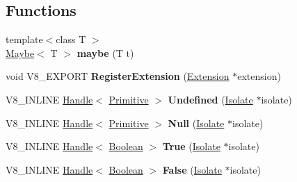 \subsection*{Functions}
\begin{DoxyCompactItemize}
\item 
\hypertarget{namespacev8_a92c0733af0c413cee85e20b983bb2a5b}{}{\footnotesize template$<$class T $>$ }\\\hyperlink{structv8_1_1_maybe}{Maybe}$<$ T $>$ {\bfseries maybe} (T t)\label{namespacev8_a92c0733af0c413cee85e20b983bb2a5b}

\item 
\hypertarget{namespacev8_a50b91e1100a42cc12e7295b22d44d9d0}{}void V8\+\_\+\+E\+X\+P\+O\+R\+T {\bfseries Register\+Extension} (\hyperlink{classv8_1_1_extension}{Extension} $\ast$extension)\label{namespacev8_a50b91e1100a42cc12e7295b22d44d9d0}

\item 
\hypertarget{namespacev8_af7d2f7fc42d6873af561b885151168d7}{}V8\+\_\+\+I\+N\+L\+I\+N\+E \hyperlink{classv8_1_1_handle}{Handle}$<$ \hyperlink{classv8_1_1_primitive}{Primitive} $>$ {\bfseries Undefined} (\hyperlink{classv8_1_1_isolate}{Isolate} $\ast$isolate)\label{namespacev8_af7d2f7fc42d6873af561b885151168d7}

\item 
\hypertarget{namespacev8_ad3e6b3f6b548745a461b71f3bfb17ef1}{}V8\+\_\+\+I\+N\+L\+I\+N\+E \hyperlink{classv8_1_1_handle}{Handle}$<$ \hyperlink{classv8_1_1_primitive}{Primitive} $>$ {\bfseries Null} (\hyperlink{classv8_1_1_isolate}{Isolate} $\ast$isolate)\label{namespacev8_ad3e6b3f6b548745a461b71f3bfb17ef1}

\item 
\hypertarget{namespacev8_acbc2c4a2a277e913ae100014559f6030}{}V8\+\_\+\+I\+N\+L\+I\+N\+E \hyperlink{classv8_1_1_handle}{Handle}$<$ \hyperlink{classv8_1_1_boolean}{Boolean} $>$ {\bfseries True} (\hyperlink{classv8_1_1_isolate}{Isolate} $\ast$isolate)\label{namespacev8_acbc2c4a2a277e913ae100014559f6030}

\item 
\hypertarget{namespacev8_aa2d11aede58f5b3b0c2abe92f9c8ee40}{}V8\+\_\+\+I\+N\+L\+I\+N\+E \hyperlink{classv8_1_1_handle}{Handle}$<$ \hyperlink{classv8_1_1_boolean}{Boolean} $>$ {\bfseries False} (\hyperlink{classv8_1_1_isolate}{Isolate} $\ast$isolate)\label{namespacev8_aa2d11aede58f5b3b0c2abe92f9c8ee40}

\end{DoxyCompactItemize}


